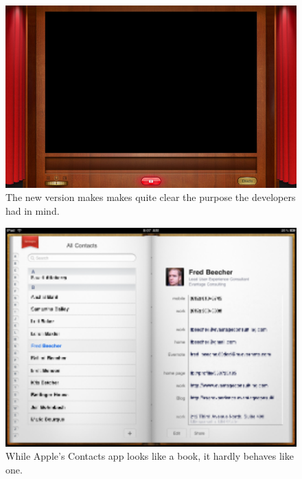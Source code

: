 \documentclass{article}
\begin{document}
\begin{figure}
\centering
\includegraphics[width=5in]{photoboothFullscreenSmall.jpg}
\caption{The new version makes makes quite clear the purpose the developers had in mind.}
\label{New Photo Booth}
\end{figure}

\begin{figure}
\centering
\includegraphics[width=5in]{contacts.jpg}
\caption{While Apple's Contacts app looks like a book, it hardly behaves like one.}
\label{Contacts}
\end{figure}
\end{document}
